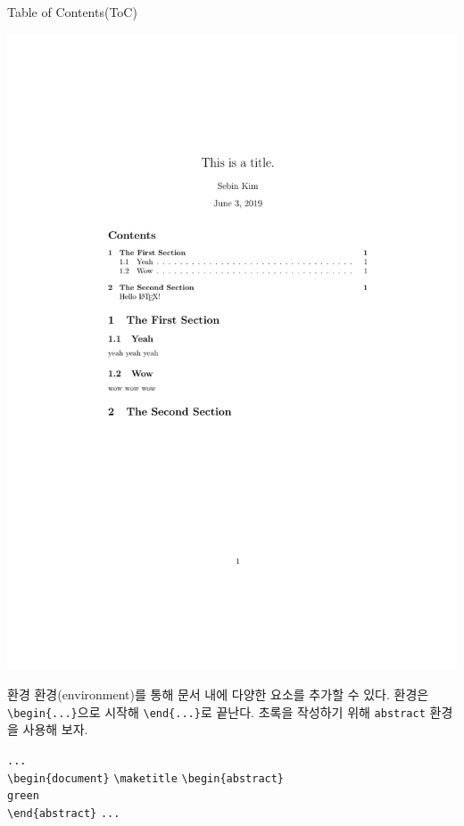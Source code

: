 \documentclass[12pt]{gshs_lecture}
\newenvironment{codeblock}[1]{
	\begin{block}{#1}
		\setstretch{1.0}
		\begin{small}
}{
		\end{small}
	\end{block}
}
\begin{document}
\begin{frame}[t]{Table of Contents(ToC)}
\begin{framed}
	\includegraphics[width=\textwidth,trim={3cm 14.5cm 3cm 6cm},clip]{./pdfs/ex5.pdf}
\end{framed}
\end{frame}

\begin{frame}[t]{환경}
	환경(environment)를 통해 문서 내에 다양한 요소를 추가할 수 있다. 환경은 \texttt{\textbackslash begin\{...\}}으로 시작해 \texttt{\textbackslash end\{...\}}로 끝난다.
	\vskip 1pc
	초록을 작성하기 위해 \texttt{abstract} 환경을 사용해 보자.
	\vskip 1pc
	\begin{codeblock}{}
		\texttt{...}\\
		\texttt{\textbackslash begin\{document\}}
		\vskip 1pc
		\texttt{\textbackslash maketitle}
		\vskip 1pc
		{\color{red}
		\texttt{\textbackslash begin\{abstract\}} \\
		\hspace{6mm} \texttt{green} \\
		\texttt{\textbackslash end\{abstract\}}}
		\vskip 1pc
		\texttt{...}\\
	\end{codeblock}
\end{frame}
\end{document}
